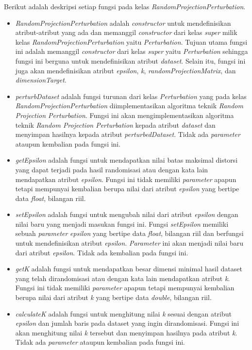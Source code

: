 Berikut adalah deskripsi setiap fungsi pada kelas \textit{RandomProjectionPerturbation}.
\begin{itemize}
	\item \textit{RandomProjectionPerturbation} adalah \textit{constructor} untuk mendefinisikan atribut-atribut yang ada dan memanggil \textit{constructor} dari kelas \textit{super} milik kelas \textit{RandomProjectionPerturbation} yaitu \textit{Perturbation}. Tujuan utama fungsi ini adalah memanggil \textit{constructor} dari kelas \textit{super} yaitu \textit{Perturbation} sehingga fungsi ini berguna untuk mendefinisikan atribut \textit{dataset}. Selain itu, fungsi ini juga akan mendefinisikan atribut \textit{epsilon}, \textit{k}, \textit{randomProjectionMatrix}, dan \textit{dimensionTarget}.
	\item \textit{perturbDataset} adalah fungsi turunan dari kelas \textit{Perturbation} yang pada kelas \textit{RandomProjectionPerturbation} diimplementasikan algoritma teknik \textit{Random Projection Perturbation}. Fungsi ini akan mengimplementasikan algoritma teknik \textit{Random Projection Perturbation} kepada atribut \textit{dataset} dan menyimpan hasilnya kepada atribut \textit{perturbedDataset}. Tidak ada \textit{parameter} ataupun kembalian pada fungsi ini.
	\item \textit{getEpsilon} adalah fungsi untuk mendapatkan nilai batas maksimal distorsi yang dapat terjadi pada hasil randomisasi atau dengan kata lain mendapatkan atribut \textit{epsilon}. Fungsi ini tidak memiliki \textit{parameter} apapun tetapi mempunyai kembalian berupa nilai dari atribut \textit{epsilon} yang bertipe data \textit{float}, bilangan riil.
	\item \textit{setEpsilon} adalah fungsi untuk mengubah nilai dari atribut \textit{epsilon} dengan nilai baru yang menjadi masukan fungsi ini. Fungsi \textit{setEpsilon} memiliki sebuah \textit{parameter} \textit{epsilon} yang bertipe data \textit{float}, bilangan riil dan berfungsi untuk mendefinisikan atribut \textit{epsilon}. \textit{Parameter} ini akan menjadi nilai baru dari atribut \textit{epsilon}. Tidak ada kembalian pada fungsi ini.
	\item \textit{getK} adalah fungsi untuk mendapatkan besar dimensi minimal hasil dataset yang telah dirandomisasi atau dengan kata lain mendapatkan atribut \textit{k}. Fungsi ini tidak memiliki \textit{parameter} apapun tetapi mempunyai kembalian berupa nilai dari atribut \textit{k} yang bertipe data \textit{double}, bilangan riil.
	\item \textit{calculateK} adalah fungsi untuk menghitung nilai \textit{k} sesuai dengan atribut \textit{epsilon} dan jumlah baris pada dataset yang ingin dirandomisasi. Fungsi ini akan menghitung nilai \textit{k} tersebut dan menyimpan hasilnya pada atribut \textit{k}. Tidak ada \textit{parameter} ataupun kembalian pada fungsi ini.

\end{itemize}
